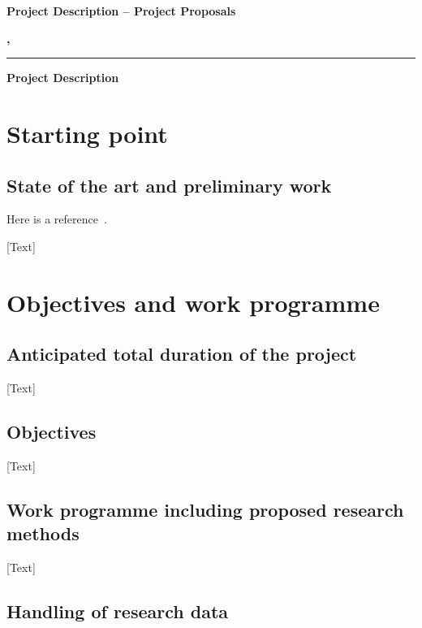 





\textbf{Project Description -- Project Proposals}
\bigskip
\bigskip

\textbf{\Author, \City}
\bigskip

\textbf{\Title}
\bigskip
\hrule
\bigskip

\textbf{\Large Project Description}

\section{Starting point}

\subsection*{State of the art and preliminary work}

Here is a reference~\cite{voges_introduction_2021}.

[Text]

\section{Objectives and work programme}

\subsection{Anticipated total duration of the project}

[Text]

\subsection{Objectives}

[Text]

\subsection{Work programme including proposed research methods}

[Text]

\subsection{Handling of research data}

